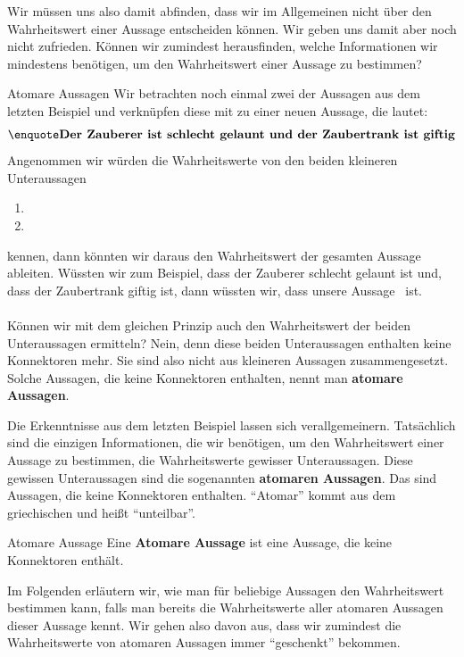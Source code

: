 \documentclass[../../main.tex]{subfiles}
\begin{document}
Wir müssen uns also damit abfinden, dass wir im Allgemeinen nicht über den Wahrheitswert einer Aussage entscheiden können. Wir geben uns damit aber noch nicht zufrieden. Können wir zumindest herausfinden, welche Informationen wir mindestens benötigen, um den Wahrheitswert einer Aussage zu bestimmen?

\begin{example}{Atomare Aussagen}
Wir betrachten noch einmal zwei der Aussagen aus dem letzten Beispiel und verknüpfen diese mit  zu einer neuen Aussage, die lautet:
\[\statement{Der Zauberer ist schlecht gelaunt und der Zaubertrank ist giftig}\]
Angenommen wir würden die Wahrheitswerte von den beiden kleineren Unteraussagen
\begin{enumerate}
    \item {}
    \item {}
\end{enumerate}
kennen, dann könnten wir daraus den Wahrheitswert der gesamten Aussage ableiten. Wüssten wir zum Beispiel, dass der Zauberer schlecht gelaunt ist und, dass der Zaubertrank giftig ist, dann wüssten wir, dass unsere Aussage  \wahr\  ist.
\\ \\
Können wir mit dem gleichen Prinzip auch den Wahrheitswert der beiden Unteraussagen ermitteln? Nein, denn diese beiden Unteraussagen enthalten keine Konnektoren mehr. Sie sind also nicht aus kleineren Aussagen zusammengesetzt. Solche Aussagen, die keine Konnektoren enthalten, nennt man \textbf{atomare Aussagen}.
\end{example}

Die Erkenntnisse aus dem letzten Beispiel lassen sich verallgemeinern. Tatsächlich sind die einzigen Informationen, die wir benötigen, um den Wahrheitswert einer Aussage zu bestimmen, die Wahrheitswerte gewisser Unteraussagen. Diese gewissen Unteraussagen sind die sogenannten \textbf{atomaren Aussagen}. Das sind Aussagen, die keine Konnektoren enthalten. \enquote{Atomar} kommt aus dem griechischen und heißt \enquote{unteilbar}.

\begin{definition} {Atomare Aussage}
Eine \textbf{Atomare Aussage} ist eine Aussage, die keine Konnektoren enthält.
\end{definition}

Im Folgenden erläutern wir, wie man für beliebige Aussagen den Wahrheitswert bestimmen kann, falls man bereits die Wahrheitswerte aller atomaren Aussagen dieser Aussage kennt. Wir gehen also davon aus, dass wir zumindest die Wahrheitswerte von atomaren Aussagen immer \enquote{geschenkt} bekommen.
\end{document}

